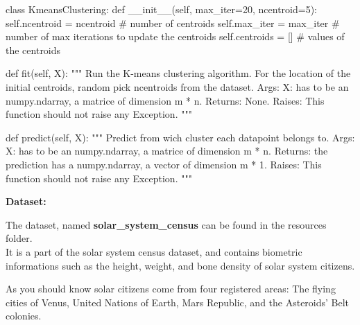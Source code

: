 \documentclass[]{article}
\newenvironment{Shaded}{\begin{snugshade}}{\end{snugshade}}
\newcommand{\CommentTok}[1]{\textcolor[rgb]{0.48,0.49,0.49}{#1}}
\newcommand{\DecValTok}[1]{\textcolor[rgb]{0.96,0.45,0.00}{#1}}
\newcommand{\FunctionTok}[1]{\textcolor[rgb]{0.56,0.27,0.68}{#1}}
\newcommand{\KeywordTok}[1]{\textcolor[rgb]{0.81,0.81,0.76}{#1}}
\newcommand{\NormalTok}[1]{\textcolor[rgb]{0.81,0.81,0.76}{#1}}
\newcommand{\OperatorTok}[1]{\textcolor[rgb]{0.81,0.81,0.76}{#1}}
\newcommand{\VariableTok}[1]{\textcolor[rgb]{0.15,0.68,0.68}{#1}}
\begin{document}
\begin{Shaded}
\begin{Highlighting}[]
\KeywordTok{class}\NormalTok{ KmeansClustering:}
    \KeywordTok{def} \FunctionTok{__init__}\NormalTok{(}\VariableTok{self}\NormalTok{, max_iter}\OperatorTok{=}\DecValTok{20}\NormalTok{, ncentroid}\OperatorTok{=}\DecValTok{5}\NormalTok{):}
        \VariableTok{self}\NormalTok{.ncentroid }\OperatorTok{=}\NormalTok{ ncentroid }\CommentTok{# number of centroids}
        \VariableTok{self}\NormalTok{.max_iter }\OperatorTok{=}\NormalTok{ max_iter }\CommentTok{# number of max iterations to update the centroids}
        \VariableTok{self}\NormalTok{.centroids }\OperatorTok{=}\NormalTok{ [] }\CommentTok{# values of the centroids}
        
    \KeywordTok{def}\NormalTok{ fit(}\VariableTok{self}\NormalTok{, X):}
        \CommentTok{"""}
\CommentTok{        Run the K-means clustering algorithm.}
\CommentTok{        For the location of the initial centroids, random pick ncentroids from the dataset.}
\CommentTok{        Args:}
\CommentTok{          X: has to be an numpy.ndarray, a matrice of dimension m * n.}
\CommentTok{        Returns:}
\CommentTok{          None.}
\CommentTok{        Raises:}
\CommentTok{          This function should not raise any Exception.}
\CommentTok{        """}

    \KeywordTok{def}\NormalTok{ predict(}\VariableTok{self}\NormalTok{, X):}
        \CommentTok{"""}
\CommentTok{        Predict from wich cluster each datapoint belongs to.}
\CommentTok{        Args:}
\CommentTok{          X: has to be an numpy.ndarray, a matrice of dimension m * n.}
\CommentTok{        Returns:}
\CommentTok{          the prediction has a numpy.ndarray, a vector of dimension m * 1.}
\CommentTok{        Raises:}
\CommentTok{          This function should not raise any Exception.}
\CommentTok{        """}
\end{Highlighting}
\end{Shaded}

\textbf{Dataset:}

The dataset, named \textbf{solar\_system\_census} can be found in the
resources folder.\\
It is a part of the solar system census dataset, and contains biometric
informations such as the height, weight, and bone density of solar
system citizens.

As you should know solar citizens come from four registered areas: The
flying cities of Venus, United Nations of Earth, Mars Republic, and the
Asteroids' Belt colonies.
\end{document}
